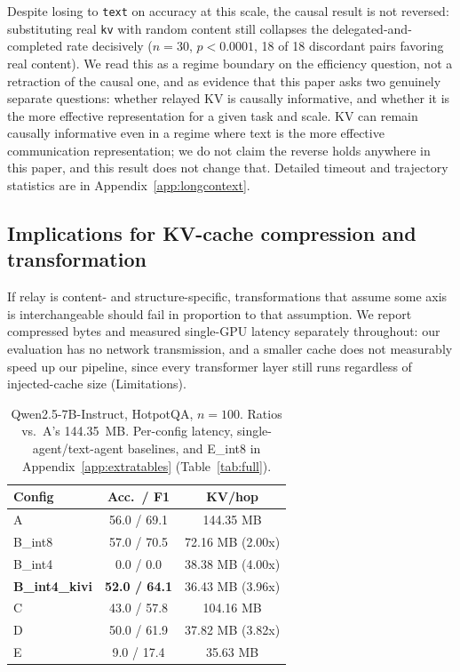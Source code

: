 \documentclass[11pt]{article}
\begin{document}
Despite losing to \texttt{text} on accuracy at this scale, the causal
result is not reversed: substituting real \texttt{kv} with random
content still collapses the delegated-and-completed rate decisively
($n=30$, $p<0.0001$, 18 of 18 discordant pairs favoring real content).
We read this as a regime boundary on the efficiency question, not a
retraction of the causal one, and as evidence that this paper asks two
genuinely separate questions: whether relayed KV is causally
informative, and whether it is the more effective representation for a
given task and scale. KV can remain causally informative even in a
regime where text is the more effective communication representation;
we do not claim the reverse holds anywhere in this paper, and this
result does not change that. Detailed timeout and trajectory
statistics are in Appendix~\ref{app:longcontext}.

\subsection{Implications for KV-cache compression and transformation}

If relay is content- and structure-specific, transformations that
assume some axis is interchangeable should fail in proportion to that
assumption. We report compressed bytes and measured single-GPU latency
separately throughout: our evaluation has no network transmission, and
a smaller cache does not measurably speed up our pipeline, since every
transformer layer still runs regardless of injected-cache size
(Limitations).

\begin{table}[t]
\centering
\small
\begin{tabular}{lcc}
\toprule
\textbf{Config} & \textbf{Acc.\ / F1} & \textbf{KV/hop} \\
\midrule
A & 56.0 / 69.1 & 144.35 MB \\
B\_int8 & 57.0 / 70.5 & 72.16 MB (2.00x) \\
B\_int4 & 0.0 / 0.0 & 38.38 MB (4.00x) \\
\textbf{B\_int4\_kivi} & \textbf{52.0 / 64.1} & 36.43 MB (3.96x) \\
C & 43.0 / 57.8 & 104.16 MB \\
D & 50.0 / 61.9 & 37.82 MB (3.82x) \\
E & 9.0 / 17.4 & 35.63 MB \\
\bottomrule
\end{tabular}
\caption{Qwen2.5-7B-Instruct, HotpotQA, $n=100$. Ratios vs.\ A's
144.35~MB. Per-config latency, single-agent/text-agent baselines, and
E\_int8 in Appendix~\ref{app:extratables} (Table~\ref{tab:full}).}
\label{tab:main}
\end{table}
\end{document}
